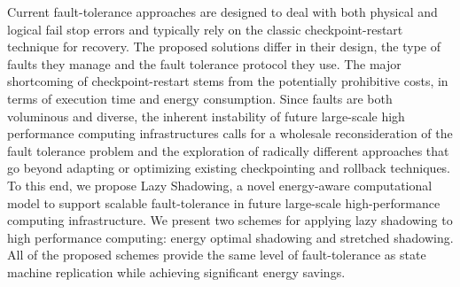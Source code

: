 Current fault-tolerance approaches are designed to deal with both
physical and logical fail stop errors and typically rely on the
classic checkpoint-restart technique for recovery. The proposed
solutions differ in their design, the type of faults they manage and
the fault tolerance protocol they use.  The major shortcoming of
checkpoint-restart stems from the potentially prohibitive costs, in
terms of execution time and energy consumption. Since faults are both
voluminous and diverse, the inherent instability of future large-scale
high performance computing infrastructures calls for a wholesale
reconsideration of the fault tolerance problem and the exploration of
radically different approaches that go beyond adapting or optimizing
existing checkpointing and rollback techniques. To this end, we
propose Lazy Shadowing, a novel energy-aware computational model to
support scalable fault-tolerance in future large-scale
high-performance computing infrastructure. We present two schemes
for applying lazy shadowing to high performance computing: energy
optimal shadowing and stretched shadowing. All of the proposed schemes provide the same
level of fault-tolerance as state machine replication while achieving significant energy
savings.
